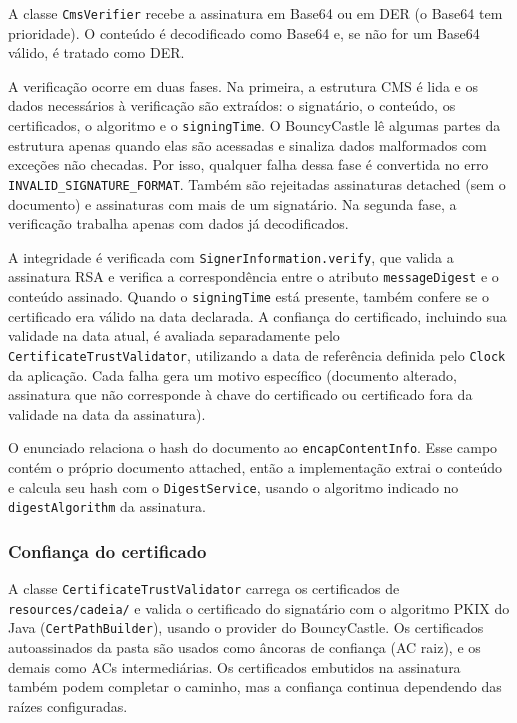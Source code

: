 \documentclass[12pt,a4paper]{article}
\begin{document}
A classe \texttt{CmsVerifier} recebe a assinatura em Base64 ou em DER (o Base64 tem prioridade). O conteúdo é decodificado como Base64 e, se não for um Base64 válido, é tratado como DER.

A verificação ocorre em duas fases. Na primeira, a estrutura CMS é lida e os dados necessários à verificação são extraídos: o signatário, o conteúdo, os certificados, o algoritmo e o \texttt{signingTime}. O BouncyCastle lê algumas partes da estrutura apenas quando elas são acessadas e sinaliza dados malformados com exceções não checadas. Por isso, qualquer falha dessa fase é convertida no erro \texttt{INVALID\_SIGNATURE\_FORMAT}. Também são rejeitadas assinaturas detached (sem o documento) e assinaturas com mais de um signatário. Na segunda fase, a verificação trabalha apenas com dados já decodificados.

A integridade é verificada com \texttt{SignerInformation.verify}, que valida a assinatura RSA e verifica a correspondência entre o atributo \texttt{messageDigest} e o conteúdo assinado. Quando o \texttt{signingTime} está presente, também confere se o certificado era válido na data declarada. A confiança do certificado, incluindo sua validade na data atual, é avaliada separadamente pelo \texttt{CertificateTrustValidator}, utilizando a data de referência definida pelo \texttt{Clock} da aplicação. Cada falha gera um motivo específico (documento alterado, assinatura que não corresponde à chave do certificado ou certificado fora da validade na data da assinatura).

O enunciado relaciona o hash do documento ao \texttt{encapContentInfo}. Esse campo contém o próprio documento attached, então a implementação extrai o conteúdo e calcula seu hash com o \texttt{DigestService}, usando o algoritmo indicado no \texttt{digestAlgorithm} da assinatura.

\subsubsection{Confiança do certificado}

A classe \texttt{CertificateTrustValidator} carrega os certificados de \texttt{resources/cadeia/} e valida o certificado do signatário com o algoritmo PKIX do Java (\texttt{CertPathBuilder}), usando o provider do BouncyCastle. Os certificados autoassinados da pasta são usados como âncoras de confiança (AC raiz), e os demais como ACs intermediárias. Os certificados embutidos na assinatura também podem completar o caminho, mas a confiança continua dependendo das raízes configuradas.
\end{document}
